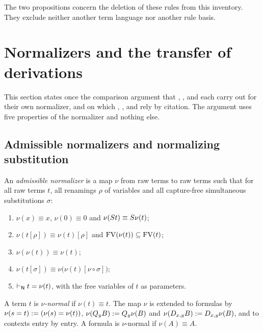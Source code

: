 The two propositions concern the deletion of these rules from this
inventory. They exclude neither another term language nor another rule
basis.

\section{Normalizers and the transfer of derivations}
\label{comp:sec:normalizers}

This section states once the comparison argument that
, ,
 and  each carry out for
their own normalizer, and on which ,
,  and  rely by
citation. The argument uses five properties of the normalizer and nothing
else.

\subsection{Admissible normalizers and normalizing substitution}

\begin{definition}
\label{comp:def:normalizer}
An \emph{admissible normalizer} is a map $\nu$ from raw terms to raw terms
such that for all raw terms $t$, all renamings $\rho$ of variables and all
capture-free simultaneous substitutions $\sigma$:
\begin{enumerate}[label=($\nu$\arabic*)]
\item $\nu(x)\equiv x$, $\nu(0)\equiv0$ and
 $\nu(S t)\equiv S\nu(t)$;
\item $\nu(t[\rho])\equiv\nu(t)[\rho]$ and $\operatorname{FV}(\nu(t))\subseteq\operatorname{FV}(t)$;
\item $\nu(\nu(t))\equiv\nu(t)$;
\item $\nu(t[\sigma])\equiv\nu\bigl(\nu(t)[\nu\circ\sigma]\bigr)$;
\item $\vdash_{\mathsf{N}}t=\nu(t)$, with the free variables of $t$ as
 parameters.
\end{enumerate}
A term $t$ is \emph{$\nu$-normal} if $\nu(t)\equiv t$. The map $\nu$ is
extended to formulas by $\nu(s=t)\mathrel{:=}(\nu(s)=\nu(t))$,
$\nu(Q_{y}B)\mathrel{:=}Q_{y}\nu(B)$ and $\nu(D_{x,y}B)\mathrel{:=}D_{x,y}\nu(B)$, and
to contexts entry by entry. A formula is $\nu$-normal if $\nu(A)\equiv A$.
\end{definition}

